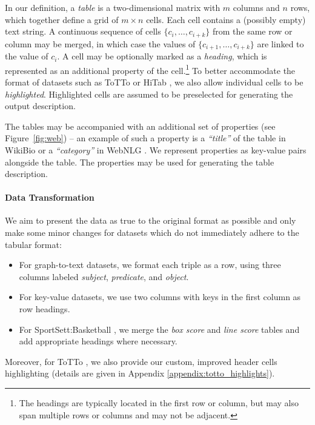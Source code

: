In our definition, a \textit{table} is a two-dimensional matrix with $m$ columns and $n$ rows, which together define a grid of $m \times n$ cells. Each cell contains a (possibly empty) text string. A continuous sequence of cells $\{c_{i}, \ldots, c_{i+k}\}$ from the same row or column may be merged, in which case the values of $\{c_{i+1},\ldots,c_{i+k}\}$ are linked to the value of $c_{i}$.  A cell may be optionally marked as a \textit{heading}, which is represented as an additional property of the cell.\footnote{The headings are typically located in the first row or column, but may also span multiple rows or columns and may not be adjacent.} To better accommodate the format of datasets such as ToTTo \cite{parikh2020totto} or HiTab \cite{cheng2021hitab}, we also allow individual cells to be \textit{highlighted}. Highlighted cells are assumed to be preselected for generating the output description.


The tables may be accompanied with an additional set of properties (see Figure~\ref{fig:web}) -- an example of such a property is a \textit{``title''} of the table in WikiBio \cite{lebret2016neural} or a \textit{``category''} in WebNLG \cite{gardent2017webnlg}. We represent properties as key-value pairs alongside the table. The properties may be used for generating the table description.

\paragraph{Data Transformation}
We aim to present the data as true to the original format as possible and only make some minor changes for datasets which do not immediately adhere to the tabular format:

\begin{itemize}
    \item For graph-to-text datasets, we format each triple as a row, using three columns labeled \textit{subject}, \textit{predicate}, and \textit{object}.
    \item For key-value datasets, we use two columns with keys in the first column as row headings.
    \item For SportSett:Basketball \cite{thomson-etal-2020-sportsett}, we merge the \textit{box score} and \textit{line score} tables and add appropriate headings where necessary.
\end{itemize}

Moreover, for ToTTo \citep{parikh2020totto}, we also provide our custom, improved header cells highlighting (details are given in Appendix \ref{appendix:totto_highlights}).


